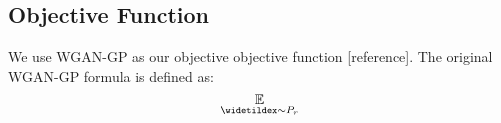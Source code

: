\subsection{Objective Function}
We use WGAN-GP as our objective objective function [reference]. The original WGAN-GP formula is defined as:
\begin{equation}
\underset{\widetildex \sim P_r}{\mathbb{E}}
\end{equation}